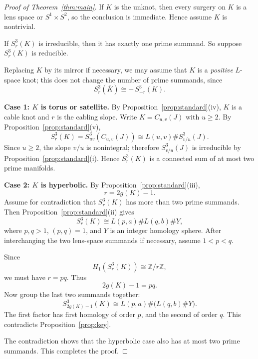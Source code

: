 \documentclass[11pt]{article}
\begin{document}
\begin{proof}[Proof of Theorem~\ref{thm:main}]
If \(K\) is the unknot, then every surgery on \(K\) is a lens space or \(S^{1}\times S^{2}\),
so the conclusion is immediate.  Hence assume \(K\) is nontrivial.

If \(S^{3}_{r}(K)\) is irreducible, then it has exactly one prime summand.
So suppose \(S^{3}_{r}(K)\) is reducible.

Replacing \(K\) by its mirror if necessary, we may assume that \(K\) is a
\emph{positive} \(L\)-space knot; this does not change the number of prime summands,
since
\[
S^{3}_{r}(\overline{K})\cong -\,S^{3}_{-r}(K).
\]

\smallskip
\noindent\textbf{Case 1: \(K\) is torus or satellite.}
By Proposition~\ref{prop:standard}(iv), \(K\) is a cable knot and \(r\) is the cabling slope.
Write \(K=C_{u,v}(J)\) with \(u\ge 2\).
By Proposition~\ref{prop:standard}(v),
\[
S^{3}_{r}(K)=S^{3}_{uv}(C_{u,v}(J))
\cong L(u,v)\# S^{3}_{v/u}(J).
\]
Since \(u\ge 2\), the slope \(v/u\) is nonintegral; therefore
\(S^{3}_{v/u}(J)\) is irreducible by Proposition~\ref{prop:standard}(i).
Hence \(S^{3}_{r}(K)\) is a connected sum of at most two prime manifolds.

\smallskip
\noindent\textbf{Case 2: \(K\) is hyperbolic.}
By Proposition~\ref{prop:standard}(iii),
\[
r=2g(K)-1.
\]
Assume for contradiction that \(S^{3}_{r}(K)\) has more than two prime summands.
Then Proposition~\ref{prop:standard}(ii) gives
\[
S^{3}_{r}(K)\cong L(p,a)\# L(q,b)\# Y,
\]
where \(p,q>1\), \((p,q)=1\), and \(Y\) is an integer homology sphere.
After interchanging the two lens-space summands if necessary, assume \(1<p<q\).

Since
\[
H_{1}\!\left(S^{3}_{r}(K)\right)\cong \mathbb{Z}/r\mathbb{Z},
\]
we must have \(r=pq\).  Thus
\[
2g(K)-1=pq.
\]
Now group the last two summands together:
\[
S^{3}_{2g(K)-1}(K)\cong L(p,a)\#\bigl(L(q,b)\# Y\bigr).
\]
The first factor has first homology of order \(p\), and the second of order \(q\).
This contradicts Proposition~\ref{prop:key}.

The contradiction shows that the hyperbolic case also has at most two prime summands.
This completes the proof.
\end{proof}
\end{document}
